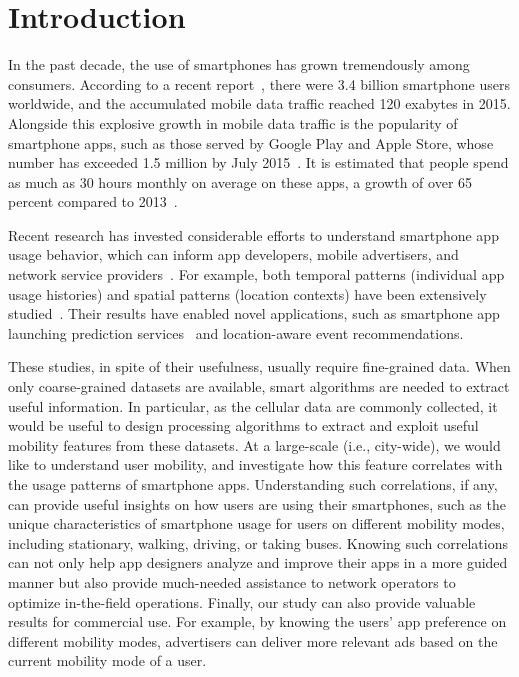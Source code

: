 \section{Introduction}\label{intro}

In the past decade, the use of smartphones has grown tremendously among consumers.
According to a recent report~\cite{Ericsson}, there were 3.4 billion smartphone users worldwide,
and the accumulated mobile data traffic reached 120 exabytes in 2015.
Alongside this explosive growth in mobile data traffic is the popularity of smartphone apps, such as those served by Google Play and Apple Store,
whose number has exceeded 1.5 million by July 2015~\cite{Statista}.
It is estimated that people spend as much as 30 hours monthly on average on these apps,
a growth of over 65 percent compared to 2013~\cite{Nielsen}.

Recent research has invested considerable efforts to understand smartphone app usage behavior, which can inform app developers, mobile advertisers, and network service providers~\cite{xu2011identifying,yang2015characterizing}.
For example, both temporal patterns (\eg individual app usage histories) and
spatial patterns (\eg location contexts) have been extensively studied~\cite{meng2014analyzing}.
Their results have enabled novel applications,
such as smartphone app launching prediction services~\cite{yan2012fast}
and location-aware event recommendations.

These studies, in spite of their usefulness, usually require fine-grained data. 
When only coarse-grained datasets are available, smart algorithms are needed to extract useful information. %
In particular, as the cellular data are commonly collected, 
it would be useful to design processing algorithms to extract and exploit useful mobility features 
from these datasets. 
At a large-scale (i.e., city-wide), we 
would like to understand user mobility, and investigate how this feature correlates with the usage patterns of smartphone apps.
Understanding such correlations, if any, can provide useful insights on how users are using their smartphones, such as the unique characteristics of smartphone usage for users on different mobility modes, including stationary, walking, driving, or taking buses. Knowing such correlations can not only help app designers analyze and improve their apps in a more guided manner but also provide much-needed assistance to network operators to optimize in-the-field operations. Finally, our study can also provide valuable results for commercial use. For example, by knowing the users' app preference on different mobility modes, advertisers can deliver more relevant ads %
based on the current mobility mode of a user. %

